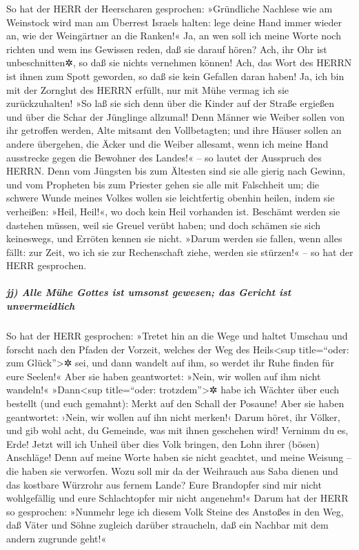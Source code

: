 So hat der HERR der Heerscharen gesprochen: »Gründliche
Nachlese wie am Weinstock wird man am Überrest Israels halten: lege
deine Hand immer wieder an, wie der Weingärtner an die Ranken!«
Ja, an wen soll ich meine Worte noch richten und wem ins
Gewissen reden, daß sie darauf hören? Ach, ihr Ohr ist unbeschnitten✲,
so daß sie nichts vernehmen können! Ach, das Wort des HERRN ist ihnen
zum Spott geworden, so daß sie kein Gefallen daran haben!
Ja, ich bin mit der Zornglut des HERRN erfüllt, nur mit
Mühe vermag ich sie zurückzuhalten! »So laß sie sich denn über die
Kinder auf der Straße ergießen und über die Schar der Jünglinge
allzumal! Denn Männer wie Weiber sollen von ihr getroffen werden, Alte
mitsamt den Vollbetagten; und ihre Häuser sollen an
andere übergehen, die Äcker und die Weiber allesamt, wenn ich meine Hand
ausstrecke gegen die Bewohner des Landes!« -- so lautet der Ausspruch
des HERRN. Denn vom Jüngsten bis zum Ältesten sind sie
alle gierig nach Gewinn, und vom Propheten bis zum Priester gehen sie
alle mit Falschheit um; die schwere Wunde meines Volkes
wollen sie leichtfertig obenhin heilen, indem sie verheißen: »Heil,
Heil!«, wo doch kein Heil vorhanden ist. Beschämt werden
sie dastehen müssen, weil sie Greuel verübt haben; und doch schämen sie
sich keineswegs, und Erröten kennen sie nicht. »Darum werden sie fallen,
wenn alles fällt: zur Zeit, wo ich sie zur Rechenschaft ziehe, werden
sie stürzen!« -- so hat der HERR gesprochen.

\hypertarget{jj-alle-muxfche-gottes-ist-umsonst-gewesen-das-gericht-ist-unvermeidlich}{%
\subparagraph{jj) Alle Mühe Gottes ist umsonst gewesen; das Gericht ist
unvermeidlich}\label{jj-alle-muxfche-gottes-ist-umsonst-gewesen-das-gericht-ist-unvermeidlich}}

So hat der HERR gesprochen: »Tretet hin an die Wege und
haltet Umschau und forscht nach den Pfaden der Vorzeit, welches der Weg
des Heils\textless sup title=``oder: zum Glück''\textgreater✲ sei, und
dann wandelt auf ihm, so werdet ihr Ruhe finden für eure Seelen!« Aber
sie haben geantwortet: »Nein, wir wollen auf ihm nicht wandeln!«
»Dann\textless sup title=``oder: trotzdem''\textgreater✲
habe ich Wächter über euch bestellt (und euch gemahnt): Merkt auf den
Schall der Posaune! Aber sie haben geantwortet: ›Nein, wir wollen auf
ihn nicht merken!‹ Darum höret, ihr Völker, und gib wohl
acht, du Gemeinde, was mit ihnen geschehen wird! Vernimm
du es, Erde! Jetzt will ich Unheil über dies Volk bringen, den Lohn
ihrer (bösen) Anschläge! Denn auf meine Worte haben sie nicht geachtet,
und meine Weisung -- die haben sie verworfen. Wozu soll
mir da der Weihrauch aus Saba dienen und das kostbare Würzrohr aus
fernem Lande? Eure Brandopfer sind mir nicht wohlgefällig und eure
Schlachtopfer mir nicht angenehm!« Darum hat der HERR so
gesprochen: »Nunmehr lege ich diesem Volk Steine des Anstoßes in den
Weg, daß Väter und Söhne zugleich darüber straucheln, daß ein Nachbar
mit dem andern zugrunde geht!«

